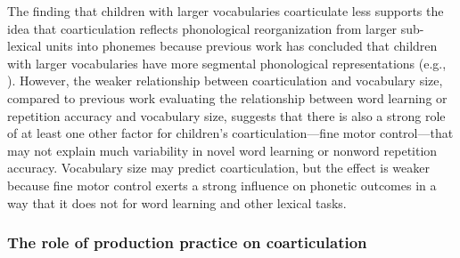 \documentclass[a4paper,man,natbib,donotrepeattitle, apacite]{apa6}
\begin{document}
The finding that children with larger vocabularies coarticulate less supports the idea that coarticulation reflects phonological reorganization from larger sub-lexical units into phonemes because previous work has concluded that children with larger vocabularies have more segmental phonological representations (e.g., ). However, the weaker relationship between coarticulation and vocabulary size, compared to previous work evaluating the relationship between word learning or repetition accuracy and vocabulary size, suggests that there is also a strong role of at least one other factor for children’s coarticulation---fine motor control---that may not explain much variability in novel word learning or nonword repetition accuracy. Vocabulary size may predict coarticulation, but the effect is weaker because fine motor control exerts a strong influence on phonetic outcomes \cite{barbierWhatAnticipatoryCoarticulation2020} in a way that it does not for word learning and other lexical tasks.

\subsubsection{The role of production practice on coarticulation}
\end{document}
